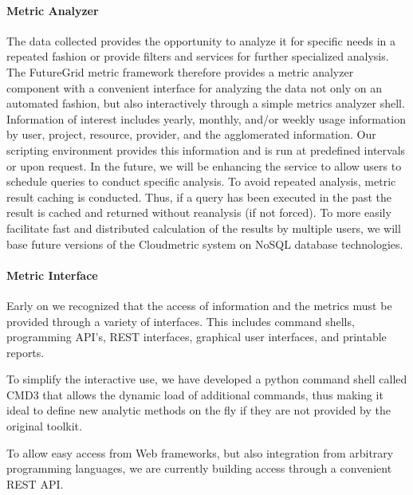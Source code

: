 \documentclass{tex/sig-alternate-2013}
\begin{document}
{\paragraph{Metric Analyzer}

The data collected provides the opportunity to analyze it for specific needs in a repeated fashion or provide filters and services for further specialized analysis. The FutureGrid metric framework therefore provides a metric analyzer component with a convenient interface for analyzing the data not only on an automated fashion, but also interactively through a simple metrics analyzer shell. Information of interest includes yearly, monthly, and/or weekly usage information by user, project, resource, provider, and the agglomerated information. Our scripting environment provides this information and is run at predefined intervals or upon request. In the future, we will be enhancing the service to allow users to schedule queries to conduct specific analysis. To avoid repeated analysis, metric result caching is conducted. Thus, if a query has been executed in the past the result is cached and returned without reanalysis (if not forced). To more easily facilitate fast and distributed calculation of the results by multiple users, we will base future versions of the Cloudmetric system on NoSQL database technologies.

\paragraph{Metric Interface}

Early on we recognized that the access of information and the metrics must be provided through a variety of interfaces. This includes command shells, programming API's, REST interfaces, graphical user interfaces, and printable reports.

\begin{description}[leftmargin=*,itemsep=0pt,topsep=0pt]

\item[Interactive Command Shell.] To simplify the interactive use, we have developed a python command shell called CMD3 that allows the dynamic load of additional commands, thus making it ideal to define new analytic methods on the fly if they are not provided by the original toolkit.

\item[REST API.] To allow easy access from Web frameworks, but also integration from arbitrary programming languages, we are currently building access through a convenient REST API.


\end{description}}
\end{document}
